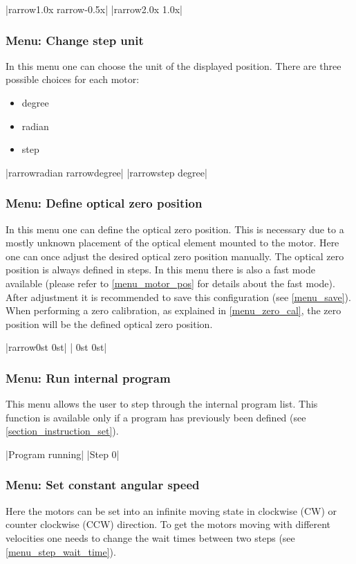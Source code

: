 |{rarrow}1.0x   {rarrow}-0.5x|
|{rarrow}2.0x    1.0x|

\subsubsection{Menu: Change step unit}
In this menu one can choose the unit of the displayed position. There are three possible choices for each motor:
\begin{itemize}
\item degree
\item radian
\item step
\end{itemize}

|{rarrow}radian {rarrow}degree|
|{rarrow}step    degree|

\subsubsection{Menu: Define optical zero position}
In this menu one can define the optical zero position. This is necessary due to a mostly unknown placement of the optical element mounted to the motor. Here one can once adjust the desired optical zero position manually. The optical zero position is always defined in steps. In this menu there is also a fast mode available (please refer to \ref{menu_motor_pos} for details about the fast mode). After adjustment it is recommended to save this configuration (see \ref{menu_save}).
When performing a zero calibration, as explained in \ref{menu_zero_cal}, the zero position will be the defined optical zero position.

|{rarrow}0st     0st|
| 0st     0st|

\subsubsection{Menu: Run internal program}
This menu allows the user to step through the internal program list. This function is available only if a program has previously been defined (see \ref{section_instruction_set}).

|Program running|
|Step 0|

\subsubsection{Menu: Set constant angular speed}
Here the motors can be set into an infinite moving state in clockwise (CW) or counter clockwise (CCW) direction. To get the motors moving with different velocities one needs to change the wait times between two steps (see \ref{menu_step_wait_time}).

